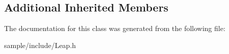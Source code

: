 \subsection*{Additional Inherited Members}


The documentation for this class was generated from the following file\+:\begin{DoxyCompactItemize}
\item 
sample/include/Leap.\+h\end{DoxyCompactItemize}
